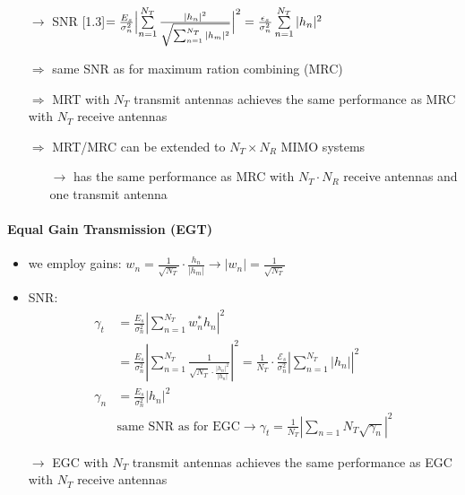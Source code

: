 \documentclass[a4paper, 10pt]{article}
\begin{document}
\begin{itemize}
\begin{itemize}
		\end{itemize}
		\item[$\rightarrow$] SNR \scalebox{1.3}[1.3]{$ = \frac{E_s}{\sigma _n^2}\Bigl | \sum\limits_{n = 1}^{N_T}\frac{|h_n|^2}{\sqrt{\sum_{n = 1}^{N_T}|h_m|^2}}\Bigr |^2 = \frac{\epsilon _s}{\sigma _n^2}\sum\limits_{n = 1}^{N_T}|h_n|^2 $}
		\item[$\Rightarrow$] same SNR as for maximum ration combining (MRC)
		\item[$\Rightarrow$] MRT with $N_T$ transmit antennas achieves the same performance as MRC with $N_T$ receive antennas
		\item[$\Rightarrow$] MRT/MRC can be extended to $ N_T\times N_R $ MIMO systems
		\begin{itemize}
			\item[$\rightarrow$] has the same performance as MRC with $N_T\cdot N_R$ receive antennas and one transmit antenna
		\end{itemize}
	\end{itemize}
\paragraph{Equal Gain Transmission (EGT)}
\begin{itemize}
	\item we employ gains: $w_n = \frac{1}{\sqrt{N_T}}\cdot \frac{h_n}{|h_m|} \rightarrow |w_n| = \frac{1}{\sqrt{N_T}} $
	\item SNR:
	\begin{align*}
		\gamma _t &= \frac{E_s}{\sigma _n^2}\left|\sum_{n = 1}^{N_T} w_n^*h_n \right |^2\\
		&= \frac{E_s}{\sigma _n^2}\left|\sum_{n = 1}^{N_T}\frac{1}{\sqrt{N_T}\cdot \frac{|h_n|^2}{|h_n|}} \right|^2 = \frac{1}{N_T}\cdot \frac{\mathcal{E}_s}{\sigma _n^2} \left|\sum_{n = 1}^{N_T}|h_n| \right|^2\\
		\gamma _n &= \frac{E_s}{\sigma _n^2}|h_n|^2\\
		&\text{same SNR as for EGC} \rightarrow \gamma _t = \frac{1}{N_T} \left| \sum_{n = 1}{N_T}\sqrt{\gamma _n} \right|^2
	\end{align*}
	\item[$\rightarrow$] EGC with $ N_T$ transmit antennas achieves the same performance as EGC with $ N_T$ receive antennas
\end{itemize}
\end{document}
